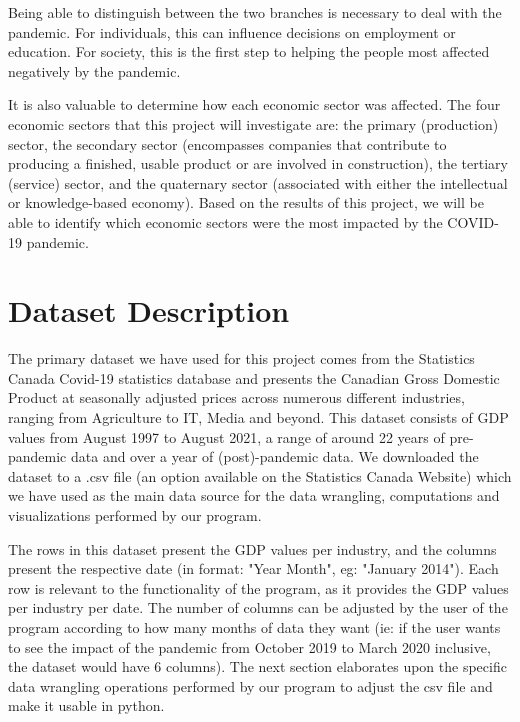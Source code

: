 \documentclass[fontsize=11pt]{article}
\begin{document}
Being able to distinguish between the two branches is necessary to deal with the pandemic. For individuals, this can influence decisions on employment or education. For society,  this is the first step to helping the people most affected negatively by the pandemic.

It is also valuable to determine how each economic sector was affected. The four economic sectors that this project will investigate are: the primary (production) sector, the secondary sector (encompasses companies that contribute to producing a finished, usable product or are involved in construction), the tertiary (service) sector, and the quaternary sector (associated with either the intellectual or knowledge-based economy). Based on the results of this project, we will be able to identify which economic sectors were the most impacted by the COVID-19 pandemic.  

\section{Dataset Description}

The primary dataset we have used for this project comes from the Statistics Canada Covid-19 statistics database and presents the Canadian Gross Domestic Product at seasonally adjusted prices across numerous different industries, ranging from Agriculture to IT, Media and beyond. This dataset consists of GDP values from August 1997 to August 2021, a range of around 22 years of pre-pandemic data and over a year of (post)-pandemic data. We downloaded the dataset to a .csv file (an option available on the Statistics Canada Website) which we have used as the main data source for the data wrangling, computations and visualizations performed by our program.

\medskip

The rows in this dataset present the GDP values per industry, and the columns present the respective date (in format: {"Year Month"}, eg: {"January 2014"}). Each row is relevant to the functionality of the program, as it provides the GDP values per industry per date. The number of columns can be adjusted by the user of the program according to how many months of data they want (ie: if the user wants to see the impact of the pandemic from October 2019 to March 2020 inclusive, the dataset would have 6 columns). The next section elaborates upon the specific data wrangling operations performed by our program to adjust the csv file and make it usable in python.
\end{document}
